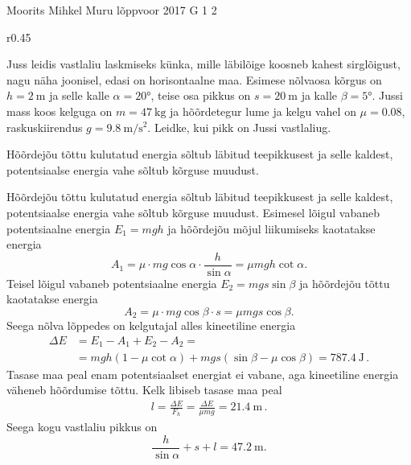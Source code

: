 {Moorits Mihkel Muru} %
{lõppvoor} %
{2017} %
{G 1} %
{2} %
{
\ifStatement
\begin{wrapfigure}[5]{r}{0.45\linewidth}
	\vspace{-5pt}
\end{wrapfigure}

Juss leidis vastlaliu laskmiseks künka, mille läbilõige koosneb kahest sirglõigust, nagu näha joonisel, edasi on horisontaalne maa. Esimese nõlvaosa kõrgus on \(h=\SI{2}{\meter}\) ja selle kalle \(\alpha=\ang{20}\), teise osa pikkus on \(s=\SI{20}{\meter}\) ja kalle \(\beta=\ang{5}\). Jussi mass koos kelguga on \(m=\SI{47}{\kilogram}\) ja hõõrdetegur lume ja kelgu vahel on \(\mu=\num{0.08}\), raskuskiirendus \(g=\SI{9.8}{\meter\per\second\squared}\). Leidke, kui pikk on Jussi vastlaliug.
\fi


\ifHint
Hõõrdejõu tõttu kulutatud energia sõltub läbitud teepikkusest ja selle kaldest, potentsiaalse energia vahe sõltub kõrguse muudust.
\fi


\ifSolution
Hõõrdejõu tõttu kulutatud energia sõltub läbitud teepikkusest ja selle kaldest, potentsiaalse energia vahe sõltub kõrguse muudust. Esimesel lõigul vabaneb potentsiaalne energia \(E_1 = mgh\) ja hõõrdejõu mõjul liikumiseks kaotatakse energia
\[
A_1 = \mu \cdot mg\cos\alpha \cdot \frac{h}{\sin\alpha} = \mu mgh \cot\alpha.
\]
Teisel lõigul vabaneb potentsiaalne energia \(E_2 = mgs \sin\beta\) ja hõõrdejõu tõttu kaotatakse energia
\[
A_2 = \mu \cdot mg \cos \beta \cdot s = \mu mgs \cos \beta.
\]
Seega nõlva lõppedes on kelgutajal alles kineetiline energia
\begin{align*}
\Delta E &= E_1 - A_1 + E_2 - A_2 = \\
&= mgh(1-\mu\cot\alpha) + mgs(\sin\beta - \mu\cos\beta) = \SI{787.4}{\joule} \, .
\end{align*}
Tasase maa peal enam potentsiaalset energiat ei vabane, aga kineetiline energia väheneb hõõrdumise tõttu. Kelk libiseb tasase maa peal
\begin{align*}
l = \frac{\Delta E}{F_h} = \frac{\Delta E}{\mu mg} = \SI{21.4}{\meter} \, .
\end{align*}
Seega kogu vastlaliu pikkus on
\[
\frac{h}{\sin\alpha} + s + l = \SI{47.2}{\meter}.
\]
\fi


}

